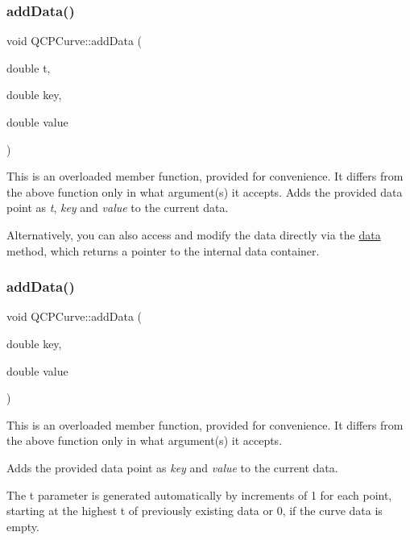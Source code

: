 \subsubsection{\texorpdfstring{add\+Data()}{addData()}\hspace{0.1cm}{\footnotesize\ttfamily [3/4]}}
{\footnotesize\ttfamily void Q\+C\+P\+Curve\+::add\+Data (\begin{DoxyParamCaption}\item[{double}]{t,  }\item[{double}]{key,  }\item[{double}]{value }\end{DoxyParamCaption})}

This is an overloaded member function, provided for convenience. It differs from the above function only in what argument(s) it accepts. Adds the provided data point as {\itshape t}, {\itshape key} and {\itshape value} to the current data.

Alternatively, you can also access and modify the data directly via the \mbox{\hyperlink{class_q_c_p_curve_a761492fd00b1ab7cb18ce23c118c6c60}{data}} method, which returns a pointer to the internal data container. \mbox{\label{class_q_c_p_curve_ada4762e793cd5707b33f35b8a4b0f8fb}} 
\subsubsection{\texorpdfstring{add\+Data()}{addData()}\hspace{0.1cm}{\footnotesize\ttfamily [4/4]}}
{\footnotesize\ttfamily void Q\+C\+P\+Curve\+::add\+Data (\begin{DoxyParamCaption}\item[{double}]{key,  }\item[{double}]{value }\end{DoxyParamCaption})}

This is an overloaded member function, provided for convenience. It differs from the above function only in what argument(s) it accepts.

Adds the provided data point as {\itshape key} and {\itshape value} to the current data.

The t parameter is generated automatically by increments of 1 for each point, starting at the highest t of previously existing data or 0, if the curve data is empty.

